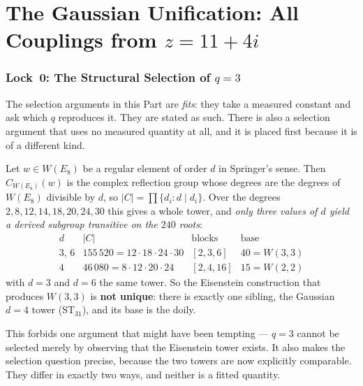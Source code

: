 \clearpage
\part{\texorpdfstring{The Gaussian Unification: All Couplings from $z=11+4i$}{The Gaussian Unification: All Couplings from z=11+4i}}

\section{\texorpdfstring{Lock~0: The Structural Selection of $q=3$}{Lock 0: The Structural Selection of q=3}}
\label{sec:lock0}

The selection arguments in this Part are \emph{fits}: they take a measured constant
and ask which $q$ reproduces it.  They are stated as such.  There is also a
selection argument that uses no measured quantity at all, and it is placed first
because it is of a different kind.

\begin{theorem}
\label{thm:springer-tower}
Let $w\in W(E_8)$ be a regular element of order $d$ in Springer's sense.  Then
$C_{W(E_8)}(w)$ is the complex reflection group whose degrees are the degrees of
$W(E_8)$ divisible by $d$, so $|C| = \prod\{d_i : d\mid d_i\}$.  Over the degrees
$2,8,12,14,18,20,24,30$ this gives a whole tower, and \emph{only three values of
$d$ yield a derived subgroup transitive on the $240$ roots}:
\[
\begin{array}{c|c|c|c}
d & |C| & \text{blocks} & \text{base}\\\hline
3,\,6 & 155\,520 = 12\cdot18\cdot24\cdot30 & [2,3,6] & 40 = W(3,3)\\
4 & 46\,080 = 8\cdot12\cdot20\cdot24 & [2,4,16] & 15 = W(2,2)
\end{array}
\]
with $d=3$ and $d=6$ the same tower.  So the Eisenstein construction that produces
$W(3,3)$ is \textbf{not unique}: there is exactly one sibling, the Gaussian
$d=4$ tower ($\mathrm{ST}_{31}$), and its base is the doily.
\end{theorem}

\noindent
This forbids one argument that might have been tempting --- $q=3$ cannot be
selected merely by observing that the Eisenstein tower exists.  It also makes the
selection question precise, because the two towers are now explicitly comparable.
They differ in exactly two ways, and neither is a fitted quantity.

